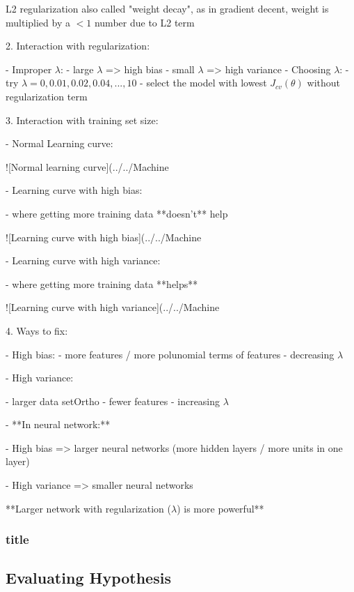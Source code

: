 L2 regularization also called "weight decay", as in gradient decent, weight is multiplied by a $<1$ number due to L2 term 

2. Interaction with regularization:

- Improper $\lambda$:
- large $\lambda$ => high bias
- small $\lambda$ => high variance
- Choosing $\lambda$:
- try $\lambda=0,0.01,0.02,0.04,...,10$
- select the model with lowest $J_{cv}(\theta)$ without regularization term

3. Interaction with training set size:

- Normal Learning curve:

![Normal learning curve](../../Machine%

- Learning curve with high bias:

- where getting more training data **doesn't** help

![Learning curve with high bias](../../Machine%

- Learning curve with high variance:

- where getting more training data **helps**

![Learning curve with high variance](../../Machine%

4. Ways to fix:

- High bias:
- more features / more polunomial terms of features
- decreasing $\lambda$

- High variance:

- larger data setOrtho
- fewer features
- increasing $\lambda$

- **In neural network:**

- High bias => larger neural networks (more hidden layers / more units in one layer)

- High variance => smaller neural networks

**Larger network with regularization ($\lambda$) is more powerful**

\subsubsection{title}

\subsection{Evaluating Hypothesis}


